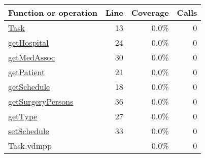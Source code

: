 \begin{longtable}{|l|r|r|r|}
\hline
Function or operation & Line & Coverage & Calls \\
\hline
\hline
\hyperref[Task:13]{Task} & 13&0.0\% & 0 \\
\hline
\hyperref[getHospital:24]{getHospital} & 24&0.0\% & 0 \\
\hline
\hyperref[getMedAssoc:30]{getMedAssoc} & 30&0.0\% & 0 \\
\hline
\hyperref[getPatient:21]{getPatient} & 21&0.0\% & 0 \\
\hline
\hyperref[getSchedule:18]{getSchedule} & 18&0.0\% & 0 \\
\hline
\hyperref[getSurgeryPersons:36]{getSurgeryPersons} & 36&0.0\% & 0 \\
\hline
\hyperref[getType:27]{getType} & 27&0.0\% & 0 \\
\hline
\hyperref[setSchedule:33]{setSchedule} & 33&0.0\% & 0 \\
\hline
\hline
Task.vdmpp & & 0.0\% & 0 \\
\hline
\end{longtable}


